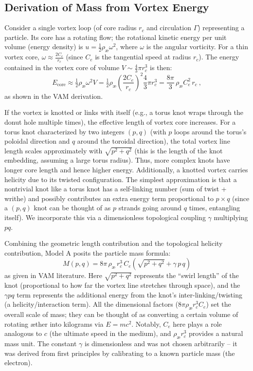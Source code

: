 \documentclass[a4paper,12pt]{article}
\begin{document}
        \subsection{Derivation of Mass from Vortex Energy}
        
        Consider a single vortex loop (of core radius $r_c$ and circulation $\Gamma$) representing a particle. Its core has a rotating flow; the rotational kinetic energy per unit volume (energy density) is $u = \tfrac{1}{2}\rho_{\text{\ae}}\omega^2$, where $\omega$ is the angular vorticity. For a thin vortex core, $\omega \approx \frac{2 C_e}{r_c}$ (since $C_e$ is the tangential speed at radius $r_c$). The energy contained in the vortex core of volume $V \sim \frac{4}{3}\pi r_c^3$ is then:
        \[
        E_{\text{core}} \approx \tfrac{1}{2}\rho_{\text{\ae}}\omega^2 V = \tfrac{1}{2}\rho_{\text{\ae}}\left(\frac{2C_e}{r_c}\right)^2 \frac{4}{3}\pi r_c^3 = \frac{8\pi}{3}\,\rho_{\text{\ae}} C_e^2\, r_c~,
        \]
        as shown in the VAM derivation.
        
        If the vortex is knotted or links with itself (e.g., a torus knot wraps through the donut hole multiple times), the effective length of vortex core increases. For a torus knot characterized by two integers $(p, q)$ (with $p$ loops around the torus’s poloidal direction and $q$ around the toroidal direction), the total vortex line length scales approximately with $\sqrt{p^2+q^2}$ (this is the length of the knot embedding, assuming a large torus radius). Thus, more complex knots have longer core length and hence higher energy. Additionally, a knotted vortex carries helicity due to its twisted configuration. The simplest approximation is that a nontrivial knot like a torus knot has a self-linking number (sum of twist + writhe) and possibly contributes an extra energy term proportional to $p \times q$ (since a $(p,q)$ knot can be thought of as $p$ strands going around $q$ times, entangling itself). We incorporate this via a dimensionless topological coupling $\gamma$ multiplying $p q$.
        
        Combining the geometric length contribution and the topological helicity contribution, Model A posits the particle mass formula:
        \begin{equation}
        \boxed{  M(p,q) = 8\pi\,\rho_{\text{\ae}}\,r_c^3\,C_e \left(\sqrt{p^2 + q^2} + \gamma\, p\,q\right)     }
        \end{equation}
        as given in VAM literature. Here $\sqrt{p^2+q^2}$ represents the “swirl length” of the knot (proportional to how far the vortex line stretches through space), and the $\gamma p q$ term represents the additional energy from the knot’s inter-linking/twisting (a helicity/interaction term). All the dimensional factors ($8\pi \rho_{\text{\ae}} r_c^3 C_e$) set the overall scale of mass; they can be thought of as converting a certain volume of rotating æther into kilograms via $E=mc^2$. Notably, $C_e$ here plays a role analogous to $c$ (the ultimate speed in the medium), and $\rho_{\text{\ae}} r_c^3$ provides a natural mass unit. The constant $\gamma$ is dimensionless and was not chosen arbitrarily – it was derived from first principles by calibrating to a known particle mass (the electron).
        
\end{document}

